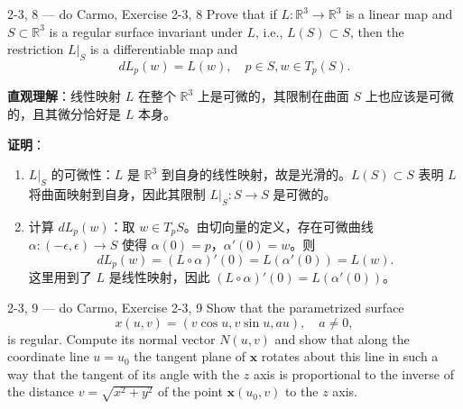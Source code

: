 \begin{exercise}{2-3, 8 — do Carmo, Exercise 2-3, 8}
Prove that if $L: \mathbb{R}^3 \to \mathbb{R}^3$ is a linear map and $S \subset \mathbb{R}^3$ is a regular surface invariant under $L$, i.e., $L(S) \subset S$, then the restriction $L|_S$ is a differentiable map and
\[
dL_p(w) = L(w), \quad p \in S, w \in T_p(S).
\]
\end{exercise}

\begin{solution}
\textbf{直观理解}：线性映射 $L$ 在整个 $\mathbb{R}^3$ 上是可微的，其限制在曲面 $S$ 上也应该是可微的，且其微分恰好是 $L$ 本身。

\textbf{证明}：
\begin{enumerate}
    \item $L|_S$ 的可微性：$L$ 是 $\mathbb{R}^3$ 到自身的线性映射，故是光滑的。$L(S) \subset S$ 表明 $L$ 将曲面映射到自身，因此其限制 $L|_S: S \to S$ 是可微的。
    \item 计算 $dL_p(w)$：取 $w \in T_pS$。由切向量的定义，存在可微曲线 $\alpha: (-\epsilon, \epsilon) \to S$ 使得 $\alpha(0) = p$，$\alpha'(0) = w$。则
    \[
    dL_p(w) = (L \circ \alpha)'(0) = L(\alpha'(0)) = L(w).
    \]
    这里用到了 $L$ 是线性映射，因此 $(L \circ \alpha)'(0) = L(\alpha'(0))$。
\end{enumerate}
\end{solution}

\begin{exercise}{2-3, 9 — do Carmo, Exercise 2-3, 9}
Show that the parametrized surface
\[
x(u, v) = (v \cos u, v \sin u, au), \quad a \neq 0,
\]
is regular. Compute its normal vector $N(u, v)$ and show that along the coordinate line $u = u_0$ the tangent plane of $\mathbf{x}$ rotates about this line in such a way that the tangent of its angle with the $z$ axis is proportional to the inverse of the distance $v = \sqrt{x^2 + y^2}$ of the point $\mathbf{x}(u_0, v)$ to the $z$ axis.
\end{exercise}

